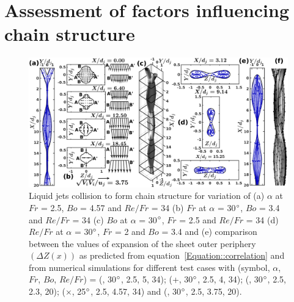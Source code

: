 \documentclass{jfm}
\begin{document}
\section{Assessment of factors influencing chain structure}
\begin{figure}
	\centering
	\includegraphics[width=\linewidth]{Figure5}
	\caption{Liquid jets collision to form chain structure for variation of (a) $\alpha$ at $Fr$ = 2.5, $Bo$ = 4.57 and $Re/Fr$ = 34 (b) $Fr$ at $\alpha$ = 30$\degree$, $Bo$ = 3.4 and $Re/Fr$ = 34 (c) $Bo$ at $\alpha$ = 30$\degree$, $Fr$ = 2.5 and $Re/Fr$ = 34 (d)  $Re/Fr$ at $\alpha$ = 30$\degree$, $Fr$ = 2 and $Bo$ = 3.4 and (e) comparison between the values of expansion of the sheet outer periphery $\left(\Delta Z(x)\right)$ as predicted from equation~\ref{Equation::correlation} and from numerical simulations for different test cases with (symbol, $\alpha$, $Fr$, $Bo$, $Re/Fr$) = (\protect\MarkerSquareRed, 30$\degree$, 2.5, 5, 34); (+, 30$\degree$, 2.5, 4, 34); (\protect \MarkerDiamondBlack, 30$\degree$, 2.5, 2.3, 20); ($\times$, 25$\degree$, 2.5, 4.57, 34) and (\protect \MarkerCircleRed, 30$\degree$, 2.5, 3.75, 20).}
	\label{Figure::phaseContours}%
\end{figure}
\end{document}
